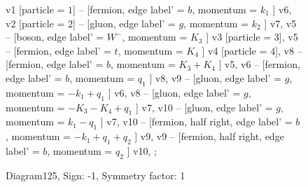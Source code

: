 \documentclass{revtex4}
\begin{document}
\begin{figure}[!htb]
\begin{center}
{    %
v1 [particle = \(1\)] -- [fermion, edge label' = \(b\), momentum = \(k_{1}\) ] v6, 
v2 [particle = \(2\)] -- [gluon, edge label' = \(g\), momentum = \(k_{2}\) ] v7, 
v5 -- [boson, edge label' = \(W^{-}\), momentum = \(K_{3}\) ] v3 [particle = \(3\)], 
v5 -- [fermion, edge label' = \(t\), momentum = \(K_{4}\) ] v4 [particle = \(4\)], 
v8 -- [fermion, edge label' = \(b\), momentum = \(K_{3} + K_{4}\) ] v5, 
v6 -- [fermion, edge label' = \(b\), momentum = \(q_{1}\) ] v8, 
v9 -- [gluon, edge label' = \(g\), momentum = \(-k_{1} + q_{1}\) ] v6, 
v8 -- [gluon, edge label' = \(g\), momentum = \(-K_{3} - K_{4} + q_{1}\) ] v7, 
v10 -- [gluon, edge label' = \(g\), momentum = \(k_{1} - q_{1}\) ] v7, 
v10 -- [fermion, half right, edge label' = \(b\), momentum = \(-k_{1} + q_{1} + q_{2}\) ] v9, 
v9 -- [fermion, half right, edge label' = \(b\), momentum = \(q_{2}\) ] v10, 
};
\end{center}
\caption{Diagram125, Sign: -1, Symmetry factor: 1}
\end{figure}
\newpage
\end{document}
